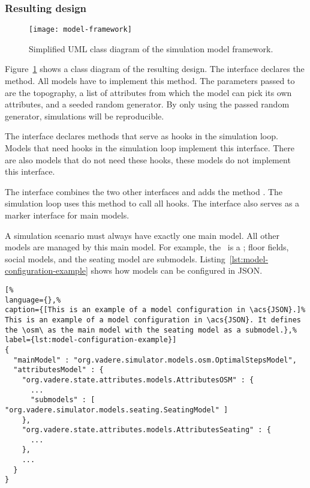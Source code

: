 \subsubsection{Resulting design}

\begin{figure}[htb]
  \centering
  \texttt{[image: model-framework]}
  \caption[Simplified \acs{UML} class diagram of simulation model framework.]{%
  Simplified \acs{UML} class diagram of the simulation model framework.
  }\label{fig:uml-model-framework}
\end{figure}

Figure~\ref{fig:uml-model-framework} shows a class diagram of the resulting
design.
The interface  declares the  method.
All models have to implement this method.
The parameters passed to  are the topography, a list of
attributes from which the model can pick its own attributes, and a seeded random
generator.
By only using the passed random generator, simulations will be reproducible.

The interface  declares methods that serve as hooks in the
simulation loop.
Models that need hooks in the simulation loop implement this interface.
There are also models that do not need these hooks, these models do not
implement this interface.

The interface  combines the two other interfaces and adds the
method .
The simulation loop uses this method to call all 
hooks.
The interface  also serves as a marker interface for main
models.

A simulation scenario must always have exactly one main model.
All other models are managed by this main model.
For example, the \osm\ is a ; floor fields, social models, and the
seating model are submodels.
Listing~\ref{lst:model-configuration-example} shows how models can be configured
in \acs{JSON}.

\begin{lstlisting}[%
language={},%
caption={[This is an example of a model configuration in \acs{JSON}.]%
This is an example of a model configuration in \acs{JSON}. It defines
the \osm\ as the main model with the seating model as a submodel.},%
label={lst:model-configuration-example}]
{
  "mainModel" : "org.vadere.simulator.models.osm.OptimalStepsModel",
  "attributesModel" : {
    "org.vadere.state.attributes.models.AttributesOSM" : {
      ...
      "submodels" : [ "org.vadere.simulator.models.seating.SeatingModel" ]
    },
    "org.vadere.state.attributes.models.AttributesSeating" : {
      ...
    },
    ...
  }
}
\end{lstlisting}

